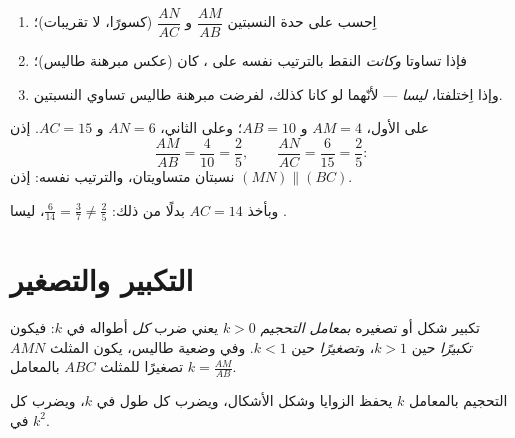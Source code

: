 \begin{method}\label{met:g9:thales:converse}
\begin{enumerate}
  \item اِحسب على حدة النسبتين $\dfrac{AM}{AB}$
        و $\dfrac{AN}{AC}$ (كسورًا، لا تقريبات)؛
  \item فإذا تساوتا \emph{وكانت} النقط بالترتيب نفسه على
        ، كان   (عكس مبرهنة طاليس)؛
  \item وإذا اِختلفتا،  \emph{ليسا}  ---
        لأنّهما لو كانا كذلك، لفرضت مبرهنة طاليس تساوي النسبتين.
\end{enumerate}
\end{method}

\begin{example}\label{ex:g9:thales:converse}
على  الأول، $AM = 4$ و $AB = 10$؛ وعلى الثاني، $AN = 6$
و $AC = 15$. إذن
\[
\frac{AM}{AB} = \frac{4}{10} = \frac25,
\qquad
\frac{AN}{AC} = \frac{6}{15} = \frac25 :
\]
نسبتان متساويتان، والترتيب نفسه: إذن $(MN) \parallel (BC)$.

وبأخذ $AC = 14$ بدلًا من ذلك: $\frac{6}{14} = \frac37 \neq \frac25$،
 ليسا .
\end{example}

\section{التكبير والتصغير}

\begin{definition}\label{def:g9:thales:scaling}
تكبير شكل أو تصغيره \emph{بمعامل التحجيم}
$k > 0$ يعني ضرب \emph{كل} أطواله في $k$: فيكون \emph{تكبيرًا} حين
$k > 1$، و\emph{تصغيرًا} حين $k < 1$. وفي وضعية طاليس، يكون المثلث
$AMN$ تصغيرًا للمثلث $ABC$ بالمعامل $k = \frac{AM}{AB}$.
\end{definition}

\begin{proposition}\label{prop:g9:thales:scaling}
التحجيم بالمعامل $k$ يحفظ الزوايا وشكل الأشكال، ويضرب كل طول في
$k$، ويضرب كل \emph{} في $k^2$.
\end{proposition}
\admitted

